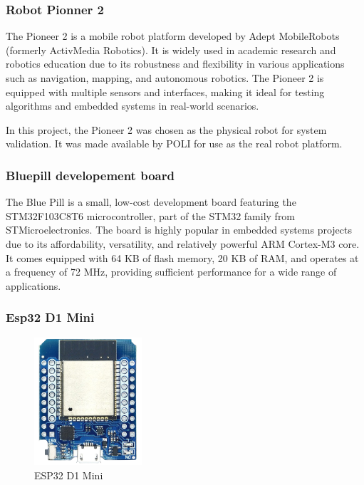 \documentclass[../../monografia.tex]{subfiles}
\begin{document}
\subsubsection{Robot Pionner 2}

The Pioneer 2 is a mobile robot platform developed by Adept MobileRobots (formerly ActivMedia Robotics). It is widely used in academic research and robotics education due to its robustness and flexibility in various applications such as navigation, mapping, and autonomous robotics. The Pioneer 2 is equipped with multiple sensors and interfaces, making it ideal for testing algorithms and embedded systems in real-world scenarios.

In this project, the Pioneer 2 was chosen as the physical robot for system validation. It was made available by POLI for use as the real robot platform.


\subsubsection{Bluepill developement board}

The Blue Pill is a small, low-cost development board featuring the STM32F103C8T6 microcontroller, part of the STM32 family from STMicroelectronics. The board is highly popular in embedded systems projects due to its affordability, versatility, and relatively powerful ARM Cortex-M3 core. It comes equipped with 64 KB of flash memory, 20 KB of RAM, and operates at a frequency of 72 MHz, providing sufficient performance for a wide range of applications.

\clearpage

\subsubsection{Esp32 D1 Mini}

\begin{figure}
    \centering
    \includegraphics[width=4cm]{esp32d1mini-removebg.png}
    \caption{ESP32 D1 Mini}
    \label{fig: ESP32 D1 mini}
\end{figure}
\end{document}
